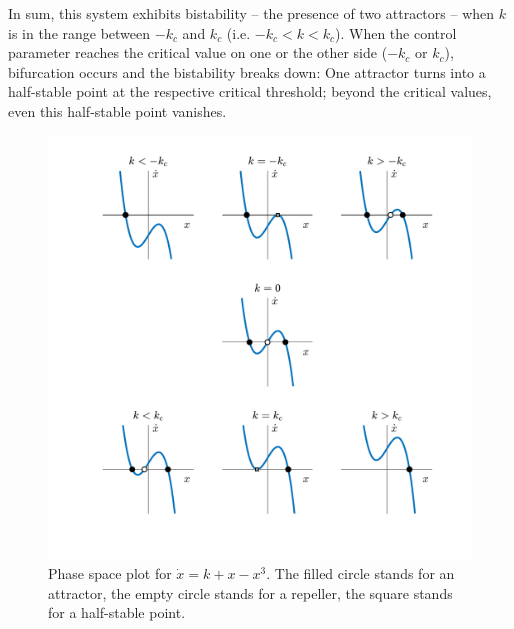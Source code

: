 In sum, this system exhibits bistability -- the presence of two attractors -- when $k$ is in the range between $-k_c$ and $k_c$ (i.e. $-k_c < k < k_c$). When the control parameter reaches the critical value on one or the other side ($-k_c$ or $k_c$), bifurcation occurs and the bistability breaks down: One attractor turns into a half-stable point at the respective critical threshold; beyond the critical values, even this half-stable point vanishes.

\begin{figure}[p]
\begin{center}
\includegraphics[width=\textwidth]{figures/ch3/double_well_force.pdf}
\caption[Phase space plot for $\dot{x} = k + x - x^3$.]{Phase space plot for $\dot{x} = k + x - x^3$. The filled circle stands for an attractor, the empty circle stands for a repeller, the square stands for a half-stable point.}
\label{fig:double_well_force}
\end{center}
\end{figure}

